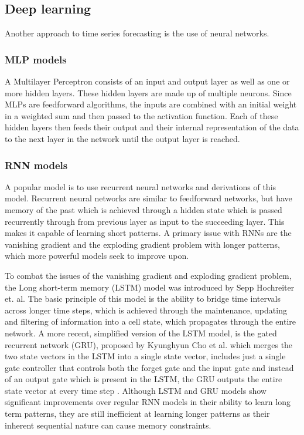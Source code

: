 \subsection{Deep learning}
Another approach to time series forecasting is the use of neural networks.
\subsubsection{MLP models}
A Multilayer Perceptron consists of an input and output layer as well as one or more hidden layers. These hidden layers are made up of multiple neurons. 
Since MLPs are feedforward algorithms, the inputs are combined with an initial weight in a weighted sum and then passed to the activation function. 
Each of these hidden layers then feeds their output and their internal representation of the data to the next layer in the network until the output layer is reached.\cite{bentoMultilayerPerceptronExplained2021}

\subsubsection{RNN models} \label{subsec:RNNModels}
A popular model is to use recurrent neural networks and derivations of this model. Recurrent neural networks are similar to feedforward networks, but have memory of the past which is achieved through a hidden state which is passed recurrently through from previous layer as input to the succeeding layer. This makes it capable of learning short patterns. 
A primary issue with RNNs are the vanishing gradient and the exploding gradient problem with longer patterns, which more powerful models seek to improve upon. \cite{AIModernApproach}\cite{hands-onML}

To combat the issues of the vanishing gradient and exploding gradient problem, the Long short-term memory (LSTM) model was introduced by Sepp Hochreiter et. al. The basic principle of this model is the ability to bridge time intervals across longer time steps, which is achieved through the maintenance, updating and filtering of information into a cell state, which propagates through the entire network\cite{LSTMPaper}. 
A more recent, simplified version of the LSTM model, is the gated recurrent network (GRU), proposed by Kyunghyun Cho et al. which merges the two state vectors in the LSTM into a single state vector, includes just a single gate controller that controls both the forget gate and the input gate and instead of an output gate which is present in the LSTM, the GRU outputs the entire state vector at every time step\cite{RNNPaper} \cite{hands-onML}.
Although LSTM and GRU models show significant improvements over regular RNN models in their ability to learn long term patterns, they are still inefficient at learning longer patterns as their inherent sequential nature can cause memory constraints\cite{AttentionIsAllYouNeed}. 